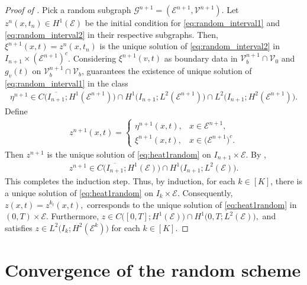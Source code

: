 \documentclass[10pt,a4paper]{amsart}
\begin{document}
\begin{proof}[Proof of ]
Pick a random subgraph $\mathcal{G}^{n+1} = (\mathcal{E}^{n+1}, \mathcal{V}^{n+1})$. Let $z^n(x,t_n) \in H^1(\mathcal{E})$ be the initial condition for \eqref{eq:random_interval1} and \eqref{eq:random_interval2} in their respective subgraphs. Then, $ \xi^{n+1}(x,t) = z^n(x,t_n)$ is the unique solution of \eqref{eq:random_interval2} in $I_{n+1} \times (\mathcal{E}^{n+1})^c$. Considering $\xi^{n+1}(v,t)$ as boundary data in $ \mathcal{V}_b^{n+1} \cap \mathcal{V}_0$ and $g_v(t)$ on $\mathcal{V}_b^{n+1} \cap \mathcal{V}_b$,  guarantees the existence of unique solution of \eqref{eq:random_interval1} in the class
\begin{align*}
  \eta^{n+1} 
  \in 
  C\bigl(\overline{I_{n+1}}; H^1(\mathcal{E}^{n+1})\bigr)
  \cap
  H^1\bigl(I_{n+1}; L^2(\mathcal{E}^{n+1})\bigr)
  \cap
  L^2\bigl(I_{n+1}; H^2(\mathcal{E}^{n+1})\bigr).
\end{align*}
Define
\begin{align*}
  z^{n+1}(x,t)
  =
  \begin{cases}
    \eta^{n+1}(x,t), & x \in \mathcal{E}^{n+1}, \\
    \xi^{n+1}(x,t),    & x \in \bigl(\mathcal{E}^{n+1}\bigr)^c.
  \end{cases}
\end{align*}
Then $z^{n+1}$ is the unique solution of \eqref{eq:heat1random} on $I_{n+1} \times \mathcal{E}$. By ,
\begin{align*}
  z^{n+1} 
  \in 
  C\bigl(\overline{I_{n+1}}; H^1(\mathcal{E})\bigr)
  \cap
  H^1\bigl(I_{n+1}; L^2(\mathcal{E})\bigr).
\end{align*}
This completes the induction step. Thus, by induction, for each $k \in [K]$, there is a unique solution of \eqref{eq:heat1random} on $I_k \times \mathcal{E}$. Consequently, $ z(x,t) = z^{k_t}(x,t),$ corresponds to the unique solution of \eqref{eq:heat1random} in $(0,T) \times \mathcal{E}$. Furthermore, $z 
  \in
  C\bigl([0,T]; H^1(\mathcal{E})\bigr)
  \cap
  H^1\bigl(0,T; L^2(\mathcal{E})\bigr),$
and satisfies $z \in L^2\bigl(I_k; H^2(\mathcal{E}^k)\bigr)$ for each $k \in [K]$.  
\end{proof}







\section{Convergence of the random scheme}\label{sec:convergence}
\end{document}
